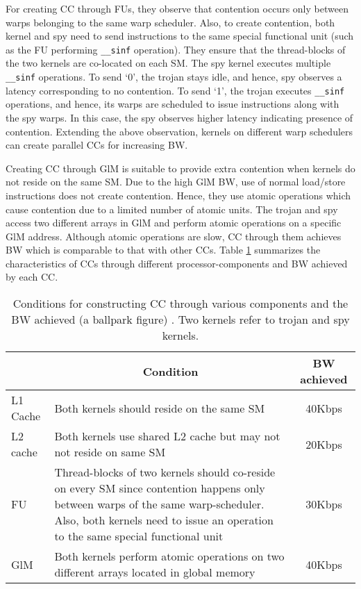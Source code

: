 For creating CC through FUs, they observe that contention occurs only between warps belonging to the same warp scheduler. Also, to create contention, both kernel and spy need to send instructions to the same special functional unit (such as the FU performing {\tt \_\_sinf} operation). They ensure that the thread-blocks of the two kernels are co-located on each SM. The spy kernel executes multiple {\tt \_\_sinf} operations. To send `0', the trojan stays idle, and hence, spy observes a latency corresponding to  no contention. To send `1', the trojan executes  {\tt \_\_sinf} operations, and hence, its warps are scheduled to issue instructions along with the spy warps. In this case, the spy observes higher latency indicating presence of contention. Extending the above observation, kernels on different warp schedulers can create parallel CCs for increasing BW.
 

Creating CC through GlM is suitable to provide extra contention when kernels do not reside on the same SM. Due to the high GlM  BW, use of normal load/store instructions does not create contention. Hence, they use atomic operations which cause contention due to a limited number of atomic units. The trojan and spy access two different arrays in GlM and perform atomic operations on a specific GlM address. Although atomic operations are slow, CC through them achieves BW which is comparable to that with other CCs. Table \ref{tab:covertchannelsummary} summarizes the characteristics of CCs through different processor-components and BW achieved by each CC. 

 
\begin{table}[htbp]
  \centering
  \caption{Conditions for constructing CC through various components and the  BW achieved (a ballpark figure) \cite{naghibijouybari2017constructing}. Two kernels refer to trojan and spy kernels.}
    \begin{tabular}{|l|p{12cm}|c|}
    \hline
          & \multicolumn{1}{|c|}{Condition} & BW achieved \\
    \hline
    L1 Cache & Both kernels should reside on the same SM & 40Kbps \\
    \hline
    L2 cache & Both kernels use shared L2 cache but may not not reside on same SM & 20Kbps \\
    \hline
    FU    & Thread-blocks of two kernels should co-reside on every SM since contention happens only between warps of the same warp-scheduler. Also, both kernels need to issue an operation to the same special functional unit & 30Kbps \\
    \hline
    GlM   & Both kernels perform atomic operations on two different arrays located in global memory & 40Kbps \\
    \hline
    \end{tabular}%
  \label{tab:covertchannelsummary}%
\end{table}%


